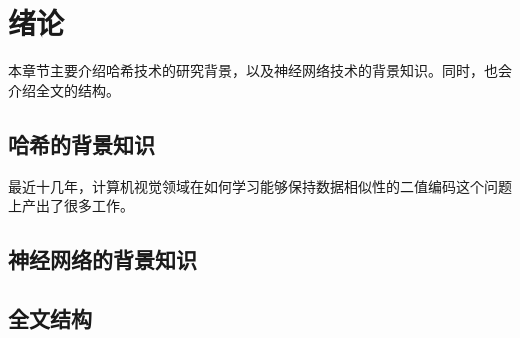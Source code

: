 
\chapter{绪论}
\label{chap:intro}

本章节主要介绍哈希技术的研究背景，以及神经网络技术的背景知识。同时，也会介绍全文的结构。

\section{哈希的背景知识}

最近十几年，计算机视觉领域在如何学习能够保持数据相似性的二值编码这个问题上产出了很多工作。\cite{IEEE-13631}\parencite{IEEE-1363}

\section{神经网络的背景知识}

\section{全文结构}


